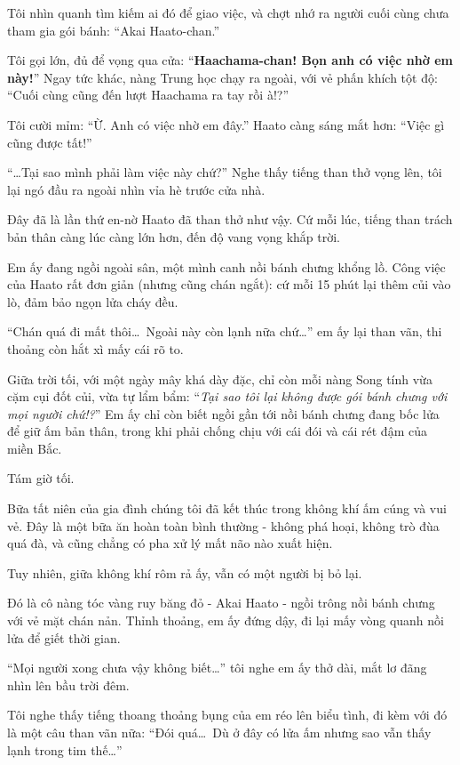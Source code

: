 \documentclass[../main.tex]{subfiles}
\begin{document}
Tôi nhìn quanh tìm kiếm ai đó để giao việc, và chợt nhớ ra người cuối cùng chưa tham gia gói bánh: ``Akai Haato-chan.''

Tôi gọi lớn, đủ để vọng qua cửa: ``\textbf{Haachama-chan! Bọn anh có việc nhờ em này!}'' Ngay tức khác, nàng Trung học chạy ra ngoài, với vẻ phấn khích tột độ: ``Cuối cùng cũng đến lượt Haachama ra tay rồi à!?''

Tôi cười mỉm: ``Ừ. Anh có việc nhờ em đây.'' Haato càng sáng mắt hơn: ``Việc gì cũng được tất!''

\ct

``\dots Tại sao mình phải làm việc này chứ?'' Nghe thấy tiếng than thở vọng lên, tôi lại ngó đầu ra ngoài nhìn vỉa hè trước cửa nhà.

Đây đã là lần thứ en-nờ Haato đã than thở như vậy. Cứ mỗi lúc, tiếng than trách bản thân càng lúc càng lớn hơn, đến độ vang vọng khắp trời.

Em ấy đang ngồi ngoài sân, một mình canh nồi bánh chưng khổng lồ. Công việc của Haato rất đơn giản (nhưng cũng chán ngắt): cứ mỗi 15 phút lại thêm củi vào lò, đảm bảo ngọn lửa cháy đều.

``Chán quá đi mất thôi\dots\ Ngoài này còn lạnh nữa chứ\dots'' em ấy lại than vãn, thi thoảng còn hắt xì mấy cái rõ to.

Giữa trời tối, với một ngày mây khá dày đặc, chỉ còn mỗi nàng Song tính vừa cặm cụi đốt củi, vừa tự lẩm bẩm: ``\textit{Tại sao tôi lại không được gói bánh chưng với mọi người chứ!?}'' Em ấy chỉ còn biết ngồi gần tới nồi bánh chưng đang bốc lửa để giữ ấm bản thân, trong khi phải chống chịu với cái đói và cái rét đậm của miền Bắc.

\ct

Tám giờ tối.

Bữa tất niên của gia đình chúng tôi đã kết thúc trong không khí ấm cúng và vui vẻ. Đây là một bữa ăn hoàn toàn bình thường - không phá hoại, không trò đùa quá đà, và cũng chẳng có pha xử lý mất não nào xuất hiện.

Tuy nhiên, giữa không khí rôm rả ấy, vẫn có một người bị bỏ lại.

Đó là cô nàng tóc vàng ruy băng đỏ - Akai Haato - ngồi trông nồi bánh chưng với vẻ mặt chán nản. Thỉnh thoảng, em ấy đứng dậy, đi lại mấy vòng quanh nồi lửa để giết thời gian.

``Mọi người xong chưa vậy không biết\dots'' tôi nghe em ấy thở dài, mắt lơ đãng nhìn lên bầu trời đêm.

Tôi nghe thấy tiếng thoang thoảng bụng của em réo lên biểu tình, đi kèm với đó là một câu than vãn nữa: ``Đói quá\dots\ Dù ở đây có lửa ấm nhưng sao vẫn thấy lạnh trong tim thế\dots''
\end{document}
